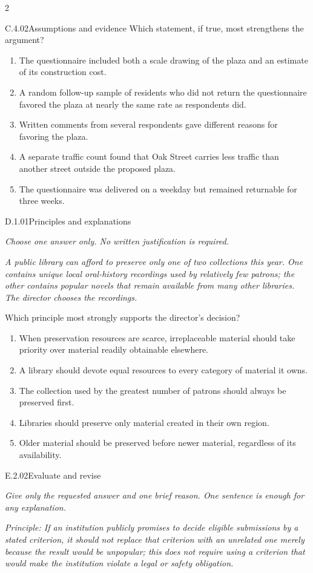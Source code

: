 \documentclass[9pt]{extarticle}
\newcommand{\choice}[1]{\item #1}
\begin{document}
\begin{multicols}{2}
\begin{DenseCoreProblem}{C.4.02}{Assumptions and evidence}
Which statement, if true, most strengthens the argument?
\begin{enumerate}[label=(\alph*)]
  \choice{The questionnaire included both a scale drawing of the plaza and an estimate of its construction cost.}
  \choice{A random follow-up sample of residents who did not return the questionnaire favored the plaza at nearly the same rate as respondents did.}
  \choice{Written comments from several respondents gave different reasons for favoring the plaza.}
  \choice{A separate traffic count found that Oak Street carries less traffic than another street outside the proposed plaza.}
  \choice{The questionnaire was delivered on a weekday but remained returnable for three weeks.}
\end{enumerate}
\end{DenseCoreProblem}
\begin{DenseCoreProblem}{D.1.01}{Principles and explanations}
{\scriptsize\textit{Choose one answer only. No written justification is required.}\par}
\emph{A public library can afford to preserve only one of two collections this year. One contains unique local oral-history recordings used by relatively few patrons; the other contains popular novels that remain available from many other libraries. The director chooses the recordings.}

Which principle most strongly supports the director's decision?
\begin{enumerate}[label=(\alph*)]
  \choice{When preservation resources are scarce, irreplaceable material should take priority over material readily obtainable elsewhere.}
  \choice{A library should devote equal resources to every category of material it owns.}
  \choice{The collection used by the greatest number of patrons should always be preserved first.}
  \choice{Libraries should preserve only material created in their own region.}
  \choice{Older material should be preserved before newer material, regardless of its availability.}
\end{enumerate}
\end{DenseCoreProblem}
\begin{DenseCoreProblem}{E.2.02}{Evaluate and revise}
{\scriptsize\textit{Give only the requested answer and one brief reason. One sentence is enough for any explanation.}\par}
\emph{Principle: If an institution publicly promises to decide eligible submissions by a stated criterion, it should not replace that criterion with an unrelated one merely because the result would be unpopular; this does not require using a criterion that would make the institution violate a legal or safety obligation.}


\end{DenseCoreProblem}
\end{multicols}
\end{document}
